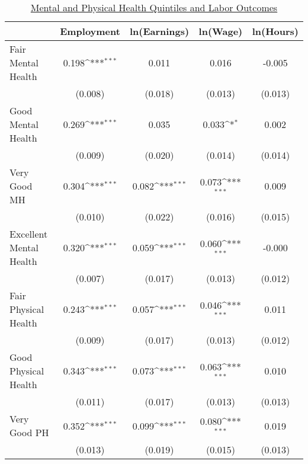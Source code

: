 \def\sym#1{\ifmmode^{#1}\else\(^{#1}\)\fi}
\begin{table}
\center\caption*{\large{\underline{Mental and Physical Health Quintiles  and Labor Outcomes}}}
\vspace{0.2cm}
\begin{tabular}{l*{4}{c}}
                    &\multicolumn{1}{c}{Employment}&\multicolumn{1}{c}{ln(Earnings)}&\multicolumn{1}{c}{ln(Wage)}&\multicolumn{1}{c}{ln(Hours)}\\
\midrule
Fair Mental Health  &       0.198\sym{***}&       0.011         &       0.016         &      -0.005         \\
                    &     (0.008)         &     (0.018)         &     (0.013)         &     (0.013)         \\
Good Mental Health  &       0.269\sym{***}&       0.035         &       0.033\sym{*}  &       0.002         \\
                    &     (0.009)         &     (0.020)         &     (0.014)         &     (0.014)         \\
Very Good MH        &       0.304\sym{***}&       0.082\sym{***}&       0.073\sym{***}&       0.009         \\
                    &     (0.010)         &     (0.022)         &     (0.016)         &     (0.015)         \\
Excellent Mental Health&       0.320\sym{***}&       0.059\sym{***}&       0.060\sym{***}&      -0.000         \\
                    &     (0.007)         &     (0.017)         &     (0.013)         &     (0.012)         \\
Fair Physical Health&       0.243\sym{***}&       0.057\sym{***}&       0.046\sym{***}&       0.011         \\
                    &     (0.009)         &     (0.017)         &     (0.013)         &     (0.012)         \\
Good Physical Health&       0.343\sym{***}&       0.073\sym{***}&       0.063\sym{***}&       0.010         \\
                    &     (0.011)         &     (0.017)         &     (0.013)         &     (0.013)         \\
Very Good PH        &       0.352\sym{***}&       0.099\sym{***}&       0.080\sym{***}&       0.019         \\
                    &     (0.013)         &     (0.019)         &     (0.015)         &     (0.013)         \\

\end{tabular}
\end{table}
